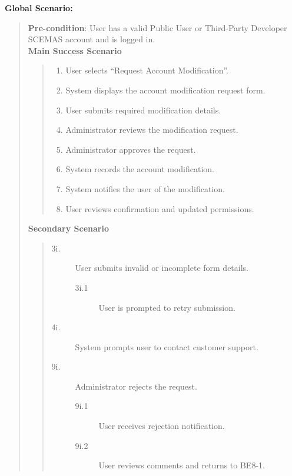 \documentclass[]{article}
\begin{document}
\begin{enumerate}[{\bf BE8.}]
\begin{enumerate}[{\bf VP1.}]
        
\end{enumerate}
{\bf Global Scenario:}
        \begin{quote}
            \textbf{Pre-condition}: User has a valid Public User or Third-Party Developer SCEMAS account and is logged in. \\
            \textbf{Main Success Scenario}
            \begin{quote}
                \begin{enumerate}[1.]
                    \item User selects ``Request Account Modification''.
                    \item System displays the account modification request form.
                    \item User submits required modification details.
                    \item Administrator reviews the modification request.
                    \item Administrator approves the request.
                    \item System records the account modification.
                    \item System notifies the user of the modification.
                    \item User reviews confirmation and updated permissions.
                \end{enumerate}
            \end{quote}
            \textbf{Secondary Scenario}
            \begin{quote}
                \begin{description}
                    \item[\textmd{3i.}] User submits invalid or incomplete form details.
                    \begin{description}
                        \item[\textmd{3i.1}] User is prompted to retry submission.
                    \end{description}
                    \item[\textmd{4i.}] System prompts user to contact customer support.
                    \item[\textmd{9i.}] Administrator rejects the request.
                    \begin{description}
                        \item[\textmd{9i.1}] User receives rejection notification.
                        \item[\textmd{9i.2}] User reviews comments and returns to BE8-1.
                    \end{description}
                    \end{description}
            \end{quote}
        \end{quote}
\end{enumerate}
\end{document}
